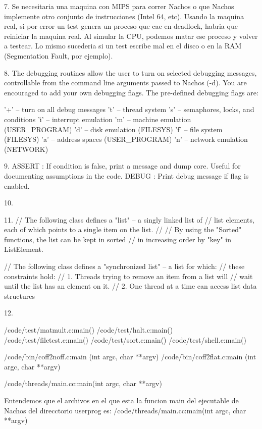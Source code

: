 \documentclass[a4paper, 11pt]{article}
\begin{document}
7.  Se necesitaria una maquina con MIPS para correr Nachos o que Nachos implemente otro conjunto de instrucciones (Intel 64, etc).
    Usando la maquina real, si por error un test genera un proceso que cae en deadlock, habria que reiniciar la maquina real. Al simular la CPU, podemos matar ese proceso y volver a testear.
    Lo mismo sucederia si un test escribe mal en el disco o en la RAM (Segmentation Fault, por ejemplo).

8. 	The debugging routines allow the user to turn on selected debugging messages, controllable from the command line arguments passed to Nachos (-d).  You are encouraged to add your own debugging flags.  The pre-defined debugging flags are:

        '+' -- turn on all debug messages
        't' -- thread system
        's' -- semaphores, locks, and conditions
        'i' -- interrupt emulation
        'm' -- machine emulation (USER_PROGRAM)
        'd' -- disk emulation (FILESYS)
        'f' -- file system (FILESYS)
        'a' -- address spaces (USER_PROGRAM)
        'n' -- network emulation (NETWORK)

9.  ASSERT : If condition is false,  print a message and dump core. Useful for documenting assumptions in the code.
    DEBUG  : Print debug message if flag is enabled.

10. 

11. 
// The following class defines a "list" -- a singly linked list of
// list elements, each of which points to a single item on the list.
//
// By using the "Sorted" functions, the list can be kept in sorted
// in increasing order by "key" in ListElement.

// The following class defines a "synchronized list" -- a list for which:
// these constraints hold:
//	1. Threads trying to remove an item from a list will
//	wait until the list has an element on it.
//	2. One thread at a time can access list data structures

12.

/code/test/matmult.c:main()
/code/test/halt.c:main()
/code/test/filetest.c:main()
/code/test/sort.c:main()
/code/test/shell.c:main()

/code/bin/coff2noff.c:main (int argc, char **argv)
/code/bin/coff2flat.c:main (int argc, char **argv)

/code/threads/main.cc:main(int argc, char **argv)


Entendemos que el archivos en el que esta la funcion main del ejecutable de Nachos del direcctorio userprog es:
/code/threads/main.cc:main(int argc, char **argv)
\end{document}
